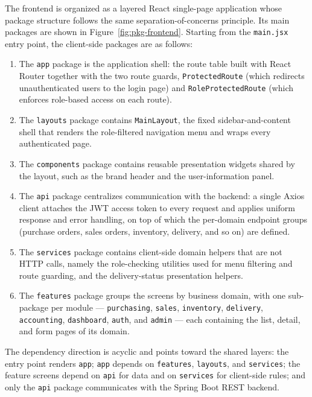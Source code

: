 The frontend is organized as a layered React single-page application whose
package structure follows the same separation-of-concerns principle. Its main
packages are shown in Figure~\ref{fig:pkg-frontend}. Starting from the
\texttt{main.jsx} entry point, the client-side packages are as follows:
\begin{enumerate}[label=(\roman*)]
  \item The \texttt{app} package is the application shell: the route table built
  with React Router together with the two route guards, \texttt{ProtectedRoute}
  (which redirects unauthenticated users to the login page) and
  \texttt{RoleProtectedRoute} (which enforces role-based access on each route).

  \item The \texttt{layouts} package contains \texttt{MainLayout}, the fixed
  sidebar-and-content shell that renders the role-filtered navigation menu and
  wraps every authenticated page.

  \item The \texttt{components} package contains reusable presentation widgets
  shared by the layout, such as the brand header and the user-information panel.

  \item The \texttt{api} package centralizes communication with the backend: a
  single Axios client attaches the JWT access token to every request and applies
  uniform response and error handling, on top of which the per-domain endpoint
  groups (purchase orders, sales orders, inventory, delivery, and so on) are
  defined.

  \item The \texttt{services} package contains client-side domain helpers that are
  not HTTP calls, namely the role-checking utilities used for menu filtering and
  route guarding, and the delivery-status presentation helpers.

  \item The \texttt{features} package groups the screens by business domain, with
  one sub-package per module --- \texttt{purchasing}, \texttt{sales},
  \texttt{inventory}, \texttt{delivery}, \texttt{accounting}, \texttt{dashboard},
  \texttt{auth}, and \texttt{admin} --- each containing the list, detail, and form
  pages of its domain.
\end{enumerate}
The dependency direction is acyclic and points toward the shared layers: the
entry point renders \texttt{app}; \texttt{app} depends on \texttt{features},
\texttt{layouts}, and \texttt{services}; the feature screens depend on
\texttt{api} for data and on \texttt{services} for client-side rules; and only the
\texttt{api} package communicates with the Spring Boot REST backend.

